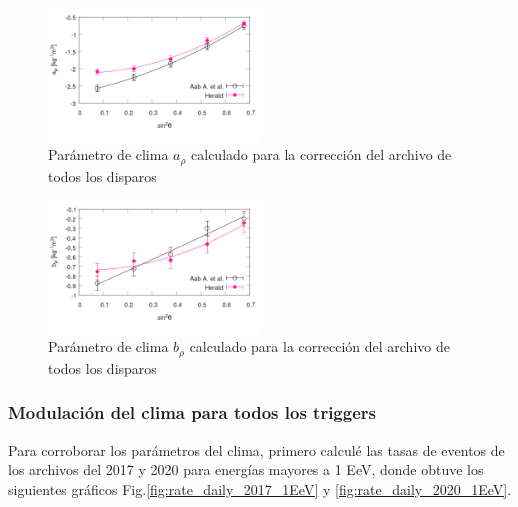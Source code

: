 \begin{figure}[H]
	\centering
	\includegraphics[width=0.5\textwidth]{arho_6t5.png}
	\caption{Parámetro de clima $a_\rho$ calculado para la corrección del archivo de todos los disparos}
\end{figure}

\begin{figure}[H]
	\centering
	\includegraphics[width=0.5\textwidth]{brho_6t5.png}
	\caption{Parámetro de clima $b_\rho$ calculado para la corrección del archivo de todos los disparos}
\end{figure}


      \subsubsection{Modulación del clima para todos los triggers}

      Para corroborar los parámetros del clima, primero calculé las tasas de eventos de los archivos del 2017 y 2020 para energías mayores a 1  EeV, donde obtuve los siguientes gráficos Fig.\ref{fig:rate_daily_2017_1EeV} y \ref{fig:rate_daily_2020_1EeV}. 

